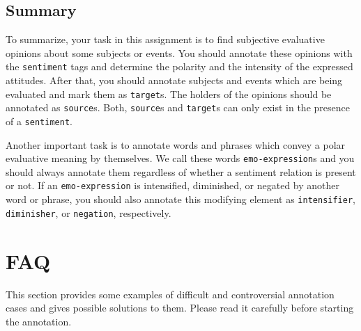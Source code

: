 \documentclass[11pt,a4paper]{article}
\theoremstyle{mytheoremstyle}
\begin{document}
\subsection{Summary}\label{subsec:summary}
To summarize, your task in this assignment is to find subjective
evaluative opinions about some subjects or events.  You should
annotate these opinions with the \texttt{sentiment} tags and determine
the polarity and the intensity of the expressed attitudes.  After
that, you should annotate subjects and events which are being
evaluated and mark them as \texttt{target}s.  The holders of the
opinions should be annotated as \texttt{source}s.  Both,
\texttt{source}s and \texttt{target}s can only exist in the presence
of a \texttt{sentiment}.

Another important task is to annotate words and phrases which convey a
polar evaluative meaning by themselves.  We call these words
\texttt{emo-expression}s and you should always annotate them
regardless of whether a sentiment relation is present or not.  If an
\texttt{emo-expression} is intensified, diminished, or negated by
another word or phrase, you should also annotate this modifying
element as \texttt{intensifier}, \texttt{diminisher}, or
\texttt{negation}, respectively.

\section{FAQ}\label{sec:faq}
This section provides some examples of difficult and controversial
annotation cases and gives possible solutions to them.  Please read it
carefully before starting the annotation.
\end{document}
